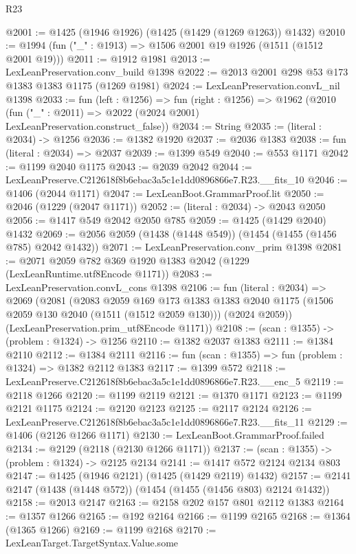 \begin{lexlean}{R23}
\begin{coremodule}
@2001 := @1425 (@1946 @1926) (@1425 (@1429 (@1269 @1263)) @1432)
@2010 := @1994 (fun ("_" : @1913) => @1506 @2001 @19 @1926 (@1511 (@1512 @2001 @19)))
@2011 := @1912 @1981
@2013 := LexLeanPreservation.conv_build @1398
@2022 := @2013 @2001 @298 @53 @173 @1383 @1383 @1175 (@1269 @1981)
@2024 := LexLeanPreservation.convL_nil @1398
@2033 := fun (left : @1256) =>
  fun (right : @1256) =>
  @1962 (@2010 (fun ("_" : @2011) => @2022 (@2024 @2001) LexLeanPreservation.construct_false))
@2034 := String
@2035 := (literal : @2034) -> @1256
@2036 := @1382 @1920
@2037 := @2036 @1383
@2038 := fun (literal : @2034) => @2037
@2039 := @1399 @549
@2040 := @553 @1171
@2042 := @1199 @2040 @1175
@2043 := @2039 @2042
@2044 := LexLeanPreserve.C212618f8b6ebac3a5c1e1dd0896866e7.R23.__fits_10
@2046 := @1406 (@2044 @1171)
@2047 := LexLeanBoot.GrammarProof.lit
@2050 := @2046 (@1229 (@2047 @1171))
@2052 := (literal : @2034) -> @2043 @2050
@2056 := @1417 @549 @2042 @2050 @785
@2059 := @1425 (@1429 @2040) @1432
@2069 := @2056 @2059 (@1438 (@1448 @549)) (@1454 (@1455 (@1456 @785) @2042 @1432))
@2071 := LexLeanPreservation.conv_prim @1398
@2081 := @2071 @2059 @782 @369 @1920 @1383 @2042 (@1229 (LexLeanRuntime.utf8Encode @1171))
@2083 := LexLeanPreservation.convL_cons @1398
@2106 := fun (literal : @2034) =>
  @2069
    (@2081
      (@2083
        @2059
        @169
        @173
        @1383
        @1383
        @2040
        @1175
        (@1506 @2059 @130 @2040 (@1511 (@1512 @2059 @130)))
        (@2024 @2059))
      (LexLeanPreservation.prim_utf8Encode @1171))
@2108 := (scan : @1355) -> (problem : @1324) -> @1256
@2110 := @1382 @2037 @1383
@2111 := @1384 @2110
@2112 := @1384 @2111
@2116 := fun (scan : @1355) => fun (problem : @1324) => @1382 @2112 @1383
@2117 := @1399 @572
@2118 := LexLeanPreserve.C212618f8b6ebac3a5c1e1dd0896866e7.R23.__enc_5
@2119 := @2118 @1266
@2120 := @1199 @2119
@2121 := @1370 @1171
@2123 := @1199 @2121 @1175
@2124 := @2120 @2123
@2125 := @2117 @2124
@2126 := LexLeanPreserve.C212618f8b6ebac3a5c1e1dd0896866e7.R23.__fits_11
@2129 := @1406 (@2126 @1266 @1171)
@2130 := LexLeanBoot.GrammarProof.failed
@2134 := @2129 (@2118 (@2130 @1266 @1171))
@2137 := (scan : @1355) -> (problem : @1324) -> @2125 @2134
@2141 := @1417 @572 @2124 @2134 @803
@2147 := @1425 (@1946 @2121) (@1425 (@1429 @2119) @1432)
@2157 := @2141 @2147 (@1438 (@1448 @572)) (@1454 (@1455 (@1456 @803) @2124 @1432))
@2158 := @2013 @2147
@2163 := @2158 @202 @157 @801 @2112 @1383
@2164 := @1357 @1266
@2165 := @192 @2164
@2166 := @1199 @2165
@2168 := @1364 (@1365 @1266)
@2169 := @1199 @2168
@2170 := LexLeanTarget.TargetSyntax.Value.some

\end{coremodule}
\end{lexlean}
